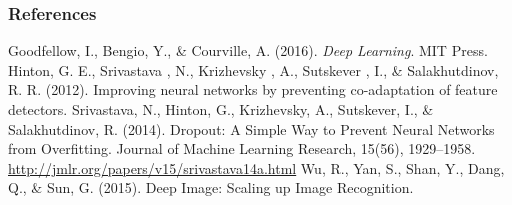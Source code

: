 \begin{vbframe}
\frametitle{References}
\footnotesize{
\begin{thebibliography}{99}
 Goodfellow, I., Bengio, Y., \& Courville, A. (2016). \textit{Deep Learning}. MIT Press. 
 Hinton, G. E., Srivastava , N., Krizhevsky , A., Sutskever , I., \& Salakhutdinov, R. R. (2012). Improving neural networks by preventing co-adaptation of feature detectors. 
     Srivastava, N., Hinton, G., Krizhevsky, A., Sutskever, I., \& Salakhutdinov, R. (2014). Dropout: A Simple Way to Prevent Neural Networks from Overfitting. Journal of Machine Learning Research, 15(56), 1929–1958. \url{http://jmlr.org/papers/v15/srivastava14a.html}
 Wu, R., Yan, S., Shan, Y., Dang, Q., \& Sun, G. (2015). Deep Image: Scaling up Image Recognition. 


\end{thebibliography}
}
\end{vbframe}

\endlecture

